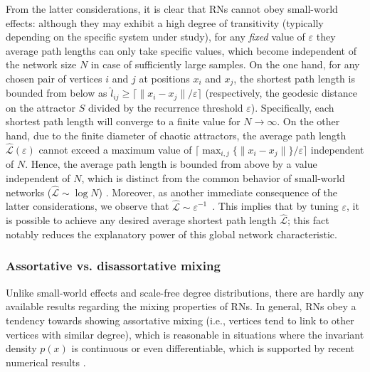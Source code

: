 		From the latter considerations, it is clear that RNs cannot obey small-world effects: although they may exhibit a high degree of transitivity (typically depending on the specific system under study), for any \emph{fixed} value of $\varepsilon$ they average path lengths can only take specific values, which become independent of the network size $N$ in case of sufficiently large samples. On the one hand, for any chosen pair of vertices $i$ and $j$ at positions $x_i$ and $x_j$, the shortest path length is bounded from below as $\hat{l}_{ij}\geq \lceil\|x_i-x_j\|/\varepsilon\rceil$ (respectively, the geodesic distance on the attractor $S$ divided by the recurrence threshold $\varepsilon$). Specifically, each shortest path length will converge to a finite value for $N\to\infty$. On the other hand, due to the finite diameter of chaotic attractors, the average path length $\hat{\mathcal{L}}(\varepsilon)$ cannot exceed a maximum value of $\lceil\max_{i,j}\{\|x_i-x_j\|\}/\varepsilon\rceil$ independent of $N$. Hence, the average path length is bounded from above by a value independent of $N$, which is distinct from the common behavior of small-world networks ($\hat{\mathcal{L}}\sim \log N$) \cite{Watts1998}. Moreover, as another immediate consequence of the latter considerations, we observe that $\hat{\mathcal{L}}\sim\varepsilon^{-1}$~\cite{Donner2010a}. This implies that by tuning $\varepsilon$, it is possible to achieve any desired average shortest path length $\hat{\mathcal{L}}$; this fact notably reduces the explanatory power of this global network characteristic.



		\subsubsection{Assortative vs. disassortative mixing}
		Unlike small-world effects and scale-free degree distributions, there are hardly any available results regarding the mixing properties of RNs. In general, RNs obey a tendency towards showing assortative mixing (i.e., vertices tend to link to other vertices with similar degree), which is reasonable in situations where the invariant density $p(x)$ is continuous or even differentiable, which is supported by recent numerical results \cite{Donges2011,Donner2010a}. 

